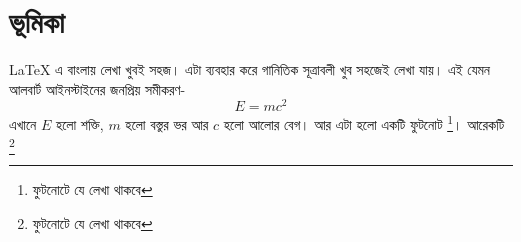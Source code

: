 \documentclass{article}
\begin{document}
\section*{ভূমিকা}

LaTeX এ বাংলায় লেখা খুবই সহজ। এটা ব্যবহার করে গানিতিক সূত্রাবলী খুব সহজেই লেখা যায়। 
 এই যেমন আলবার্ট আইনস্টাইনের জনপ্রিয় সমীকরণ-
\begin{equation}
E=mc^2
\end{equation} 
এখানে $E$ হলো শক্তি, $m$ হলো বস্তুর ভর আর $c$ হলো আলোর বেগ। আর এটা হলো একটি ফুটনোট \footnote[1]{ফুটনোটে যে লেখা থাকবে}। আরেকটি \footnote[2]{ফুটনোটে যে লেখা থাকবে}
\end{document}
